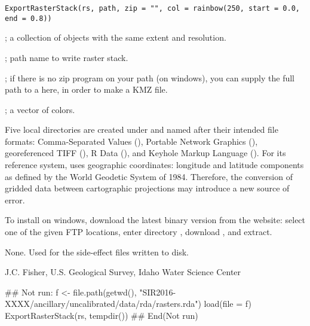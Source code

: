 \documentclass[letterpaper]{book}
\begin{document}
%
\begin{Usage}
\begin{verbatim}
ExportRasterStack(rs, path, zip = "", col = rainbow(250, start = 0.0, end = 0.8))
\end{verbatim}
\end{Usage}
%
\begin{Arguments}
\begin{ldescription}
\item[\code{rs}] ; a collection of  objects with the same extent and resolution.
\item[\code{path}] ; path name to write raster stack.
\item[\code{zip}] ; if there is no zip program on your path (on windows), you can supply the full path to a  here, in order to make a KMZ file.
\item[\code{col}] ; a vector of colors.
\end{ldescription}
\end{Arguments}
%
\begin{Details}\relax
Five local directories are created under  and named after their intended file formats:
Comma-Separated Values (),
Portable Network Graphics (),
georeferenced TIFF (),
R Data (),
and Keyhole Markup Language ().
For its reference system,  uses geographic coordinates: longitude and latitude components as defined by the World Geodetic System of 1984.
Therefore, the conversion of gridded data between cartographic projections may introduce a new source of error.

To install  on windows, download the latest binary version from the  website:
select one of the given FTP locations, enter directory , download , and extract.
\end{Details}
%
\begin{Value}
None. Used for the side-effect files written to disk.
\end{Value}
%
\begin{Author}\relax
J.C. Fisher, U.S. Geological Survey, Idaho Water Science Center
\end{Author}
%
\begin{SeeAlso}\relax
{}
\end{SeeAlso}
%
\begin{Examples}
\begin{ExampleCode}
## Not run: 
f <- file.path(getwd(), "SIR2016-XXXX/ancillary/uncalibrated/data/rda/rasters.rda")
load(file = f)
ExportRasterStack(rs, tempdir())
## End(Not run)
\end{ExampleCode}
\end{Examples}
\end{document}
